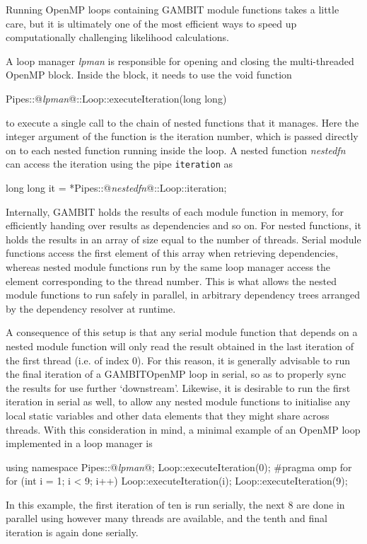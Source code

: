 \documentclass[pdftex,twocolumn,epjc3_preprint,runningheads]{svjour3}
\renewcommand{\_}{\discretionary{\underscore}{}{\underscore}}
\newcommand{\metavarf}[1]{\textit{\color{darkgreen}\footnotesize\textrm{#1}}}
\newcommand{\metavar}{\metavarf}
\newcommand{\gambit}{\textsf{GAMBIT}\xspace}
\newcommand{\GB}{\gambit}
\newcommand{\omp}{\textsf{OpenMP}\xspace}
\begin{document}
Running \omp loops containing \GB module functions takes a little care, but it is ultimately one of the most efficient ways to speed up computationally challenging likelihood calculations.

A loop manager \metavar{lpman} is responsible for opening and closing the multi-threaded \omp block.  Inside the block, it needs to use the void function
\begin{lstcpp}
Pipes::@\metavar{lpman}@::Loop::executeIteration(long long)
\end{lstcpp}
to execute a single call to the chain of nested functions that it manages.  Here the integer argument of the function is the iteration number, which is passed directly on to each nested function running inside the loop. A nested function \metavar{nested\_fn} can access the iteration using the pipe \lstinline{iteration} as
\begin{lstcpp}
long long it = *Pipes::@\metavar{nested\_fn}@::Loop::iteration;
\end{lstcpp}
Internally, \GB holds the results of each module function in memory, for efficiently handing over results as dependencies and so on. For nested functions, it holds the results in an array of size equal to the number of threads.  Serial module functions access the first element of this array when retrieving dependencies, whereas nested module functions run by the same loop manager access the element corresponding to the thread number.  This is what allows the nested module functions to run safely in parallel, in arbitrary dependency trees arranged by the dependency resolver at runtime.

A consequence of this setup is that any serial module function that depends on a nested module function will only read the result obtained in the last iteration of the first thread (i.e. of index 0).  For this reason, it is generally advisable to run the final iteration of a \GB \omp loop in serial, so as to properly sync the results for use further `downstream'.  Likewise, it is desirable to run the first iteration in serial as well, to allow any nested module functions to initialise any local static variables and other data elements that they might share across threads.  With this consideration in mind, a minimal example of an \omp loop implemented in a loop manager is
\begin{lstcpp}
using namespace Pipes::@\metavar{lpman}@;
Loop::executeIteration(0);
#pragma omp for
for (int i = 1; i < 9; i++)
{
  Loop::executeIteration(i);
}
Loop::executeIteration(9);
\end{lstcpp}
In this example, the first iteration of ten is run serially, the next 8 are done in parallel using however many threads are available, and the tenth and final iteration is again done serially.
\end{document}
